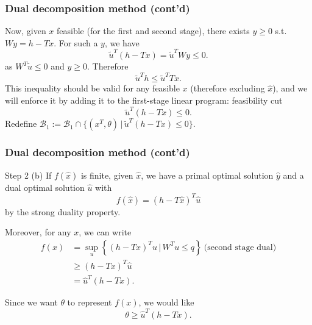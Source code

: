 \documentclass{beamer}
\begin{document}
\begin{frame}
\frametitle{Dual decomposition method (cont'd)}

Now, given $x$ feasible (for the first and second stage), there exists $y \geq 0$ s.t. $Wy = h-Tx$.
For such a $y$, we have
\[
\tilde{u}^T(h-Tx) = \tilde{u}^T W y \leq 0.
\]
as $W^T\tilde{u} \leq 0$ and $y \geq 0$.
Therefore
\[
\tilde{u}^Th \leq \tilde{u}^TTx.
\]
This inequality should be valid for any feasible $x$ (therefore excluding $\hat{x}$), and we will enforce it by adding it to the first-stage linear program: {\red feasibility cut}
\[
\tilde{u}^T(h-Tx) \leq 0.
\]
Redefine $\mathcal{B}_1 := \mathcal{B}_1 \cap \lbrace (x^T,
\theta) \,|\, \tilde{u}^T(h-Tx) \leq 0 \rbrace$.

\end{frame}
	
	
	

\begin{frame}
\frametitle{Dual decomposition method (cont'd)}

{\red Step 2 (b)}
If $f(\hat{x})$ is finite, given $\hat{x}$, we have a primal optimal solution $\hat{y}$ and a dual optimal solution $\hat{u}$ with
\[
f(\hat{x}) = (h-T\hat{x})^T \hat{u}
\]
by the strong duality property.

\mbox{}

Moreover, for any $x$, we can write
\begin{align*}
f(x) &= \sup_u \left\lbrace (h-Tx)^Tu \,|\, W^Tu \leq q \right\rbrace \ \mbox{(second stage dual)}\\
&\geq (h-Tx)^T \hat{u} \\
&= \hat{u}^T(h-Tx).
\end{align*}

Since we want $\theta$ to represent $f(x)$, we would like
\[
\theta \geq \hat{u}^T(h-Tx).
\]

\end{frame}

\end{document}
